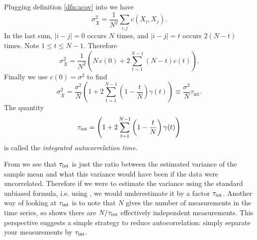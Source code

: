 Plugging definition \eqref{dfn:acov} into  we have 
\begin{equation}
  \sigma^2_{\bar{X}}=\frac{1}{N^2}\sum_{i,j}c(X_i,X_j).
\end{equation}
In the last sum, $|i-j|=0$ occurs $N$ times, and $|i-j|=t$ occurs
$2(N-t)$ times. Note $1\leq t\leq N-1$. Therefore
\begin{equation}
  \sigma^2_{\bar{X}}=\frac{1}{N^2}
    \left(N\,c(0)+2\sum_{t=1}^{N-1}(N-t)c(t)\right).
\end{equation}
Finally we use $c(0)=\sigma^2$ to find
\begin{equation}\label{eq:IAC}
  \sigma^2_{\bar{X}}
    =\frac{\sigma^2}{N}\left(1+2\sum_{t=1}^{N-1}\left(1-\frac{t}{N}\right)
     \gamma(t)\right)
    \equiv\frac{\sigma^2}{N}\tau_\text{int}.
\end{equation}
The quantity
\begin{equation}\label{dfn:IAC}\index{autocorrelation time!integrated}
  \tauint=\left(1+2\sum_{t=1}^{N-1}\left(1-\frac{t}{N}\right)
   \gamma(t)\right)
\end{equation}
is called the {\it integrated autocorrelation time}.

From  we see that $\tau_\text{int}$ is just the ratio between the
estimated variance of the sample mean and what this variance would have been 
if the data were uncorrelated. Therefore if we were to estimate the variance
using the standard unbiased formula, i.e. using , we would
underestimate it by a factor $\tau_\text{int}$. Another way of looking at $\tau_\text{int}$ is
to note that $N$ gives the number of measurements in the time series, so
 shows there are $N/\tau_\text{int}$ effectively independent
measurements. This perspective suggests a simple strategy to reduce
autocorrelation: simply separate your measurements by $\tau_\text{int}$.

